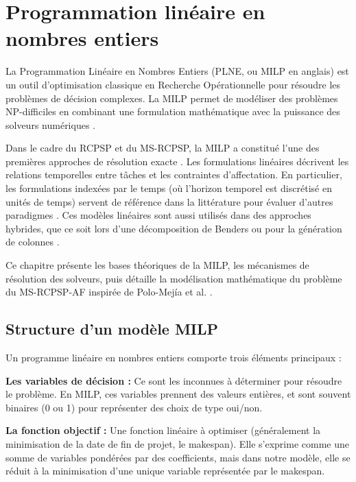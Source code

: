 \section{Programmation linéaire en nombres entiers}

La Programmation Linéaire en Nombres Entiers (PLNE, ou MILP en anglais) est un outil d'optimi\-sation classique en Recherche Opérationnelle pour résoudre les problèmes de décision complexes. La MILP permet de modéliser des problèmes NP-difficiles \cite{karp2010reducibility} en combinant une formulation mathématique avec la puissance des solveurs numériques \cite{papadimitriou1998combinatorial}.

\bigskip

Dans le cadre du RCPSP et du MS-RCPSP, la MILP a constitué l'une des premières approches de résolution exacte \cite{demeulemeester2006project}. Les formulations linéaires décrivent les relations temporelles entre tâches et les contraintes d'affectation. En particulier, les formulations indexées par le temps (où l'horizon temporel est discrétisé en unités de temps) servent de référence dans la littérature pour évaluer d'autres paradigmes \cite{almeida2019modeling}. Ces modèles linéaires sont aussi utilisés dans des approches hybrides, que ce soit lors d'une décomposition de Benders \cite{LiHaitao2009Spwm, li2015benders} ou pour la génération de colonnes \cite{correia2015modeling, montoya2014branch}.

\bigskip

Ce chapitre présente les bases théoriques de la MILP, les mécanismes de résolution des solveurs, puis détaille la modélisation mathématique du problème du MS-RCPSP-AF inspirée de Polo-Mejía et al. \cite{polo2020mixed, polo2023heuristic, polomejia:tel-02309284}.

\subsection{Structure d'un modèle MILP}
Un programme linéaire en nombres entiers comporte trois éléments principaux :
\bigskip

\noindent\textbf{Les variables de décision :} Ce sont les inconnues à déterminer pour résoudre le problème. En MILP, ces variables prennent des valeurs entières, et sont souvent binaires (0 ou 1) pour représenter des choix de type oui/non.
\bigskip

\noindent\textbf{La fonction objectif :} Une fonction linéaire à optimiser (généralement la minimisation de la date de fin de projet, le makespan). Elle s'exprime comme une somme de variables pondérées par des coefficients, mais dans notre modèle, elle se réduit à la minimisation d'une unique variable représentée par le makespan.
\bigskip


